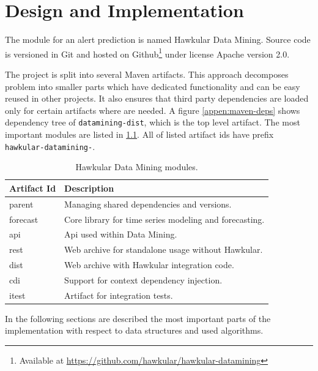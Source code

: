 \chapter{Design and Implementation}
The module for an alert prediction is named Hawkular Data Mining. Source code is versioned in Git and
hosted on Github\footnote{Available at \url{https://github.com/hawkular/hawkular-datamining}} under
license Apache version 2.0.

The project is split into several Maven artifacts. This approach decomposes problem into smaller parts
which have dedicated functionality and can be easy reused in other projects. It also ensures that
third party dependencies are loaded only for certain artifacts where are needed. A figure \ref{appen:maven-deps}
shows dependency tree of \texttt{datamining-dist}, which is the top level artifact. The most important modules are
listed in \ref{tab:datamining-modules}. All of listed artifact ids have prefix \texttt{hawkular-datamining-}.

\begin{table}[h]
    \begin{center}
        \begin{tabular}{l|l}
                \textbf{Artifact Id} & \textbf{Description} \\ \hline \hline
                parent & Managing shared dependencies and versions. \\
                forecast & Core library for time series modeling and forecasting. \\
                api & Api used within Data Mining. \\
                rest & Web archive for standalone usage without Hawkular. \\
                dist & Web archive with Hawkular integration code. \\
                cdi & Support for context dependency injection. \\
                itest & Artifact for integration tests.
        \end{tabular}
        \caption{Hawkular Data Mining modules.}
        \label{tab:datamining-modules}
    \end{center}
\end{table}

In the following sections are described the most important parts of the implementation with respect to data structures
and used algorithms.

